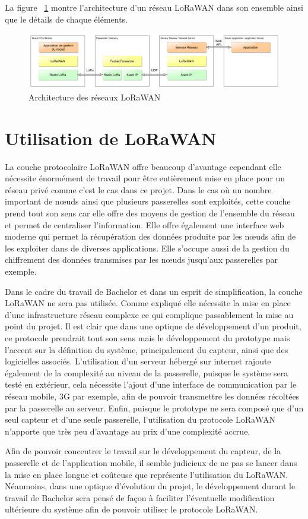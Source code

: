La figure ~\ref{fig:network_lorawan}  montre l’architecture d’un réseau LoRaWAN dans son ensemble ainsi que le détails de chaque éléments.

\begin{figure}[htb]
\centering 
\includegraphics[width=1\columnwidth]{../images/lorawan_reseau.png} 
\caption[Architecture LoRaWAN]{Architecture des réseaux LoRaWAN}
\label{fig:network_lorawan}
\end{figure}

\section{Utilisation de LoRaWAN}

La couche protocolaire LoRaWAN offre beaucoup d’avantage cependant elle nécessite énormément de travail pour être entièrement mise en place pour un réseau privé comme c’est le cas dans ce projet. Dans le cas où un nombre important de nœuds ainsi que plusieurs passerelles sont exploités, cette couche prend tout son sens car elle offre des moyens de gestion de l’ensemble du réseau et permet de centraliser l’information. Elle offre également une interface web moderne qui permet la récupération des données produite par les nœuds afin de les exploiter dans de diverses applications. Elle s’occupe aussi de la gestion du chiffrement des données transmises par les nœuds jusqu’aux passerelles par exemple.

Dans le cadre du travail de Bachelor et dans un esprit de simplification, la couche LoRaWAN ne sera pas utilisée. Comme expliqué elle nécessite la mise en place d’une infrastructure réseau complexe ce qui complique passablement la mise au point du projet. Il est clair que dans une optique de développement d’un produit, ce protocole prendrait tout son sens mais le développement du prototype mais l’accent sur la définition du système, principalement du capteur, ainsi que des logicielles associés. L’utilisation d’un serveur hébergé sur internet rajoute également de la complexité au niveau de la passerelle, puisque le système sera testé en extérieur, cela nécessite l’ajout d’une interface de communication par le réseau mobile, 3G par exemple, afin de pouvoir transmettre les données récoltées par la passerelle au serveur. Enfin, puisque le prototype ne sera composé que d’un seul capteur et d’une seule passerelle, l’utilisation du protocole LoRaWAN n’apporte que très peu d’avantage au prix d’une complexité accrue.

Afin de pouvoir concentrer le travail sur le développement du capteur, de la passerelle et de l’application mobile, il semble judicieux de ne pas se lancer dans la mise en place longue et coûteuse que représente l’utilisation du LoRaWAN. Néanmoins, dans une optique d’évolution du projet, le développement durant le travail de Bachelor sera pensé de façon à faciliter l’éventuelle modification ultérieure du système afin de pouvoir utiliser le protocole LoRaWAN.

